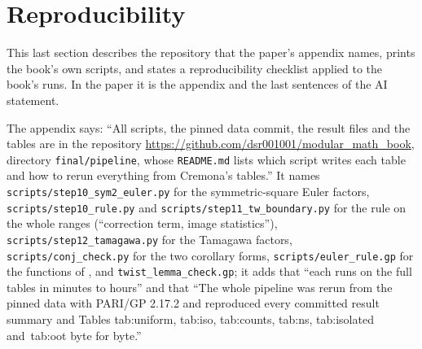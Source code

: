 \begin{sloppypar}
\section{Reproducibility}\label{sec:computation:reproducibility}

This last section describes the repository that the paper's appendix names, prints the book's own scripts, and states a reproducibility checklist
applied to the book's runs. In the paper it is the appendix and the last sentences of the AI statement.

\begin{remark}\label{rem:computation:paper-repository}
The appendix says: ``All scripts, the pinned data commit, the result files and the tables are in the repository
\url{https://github.com/dsr001001/modular_math_book}, directory \texttt{final/\allowbreak pipeline}, whose \texttt{README.md} lists which script writes each table and how to rerun everything from Cremona's tables.'' It names \texttt{scripts/step10\_sym2\_euler.py} for the
symmetric-square Euler factors, \texttt{scripts/step10\_rule.py} and \texttt{scripts/step11\_tw\_boundary.py} for the rule on the whole ranges
(``correction term, image statistics''), \texttt{scripts/step12\_tamagawa.py} for the Tamagawa factors, \texttt{scripts/conj\_check.py} for the two
corollary forms, \texttt{scripts/euler\_rule.gp} for the functions of , and \texttt{twist\_lemma\_check.gp}; it adds
that ``each runs on the full tables in minutes to hours'' and that ``The whole pipeline was rerun from the pinned data with PARI/GP 2.17.2 and reproduced every committed result summary and Tables tab:uniform, tab:iso, tab:counts, tab:ns, tab:isolated and~tab:oot byte for byte.''


\end{remark}
\end{sloppypar}
